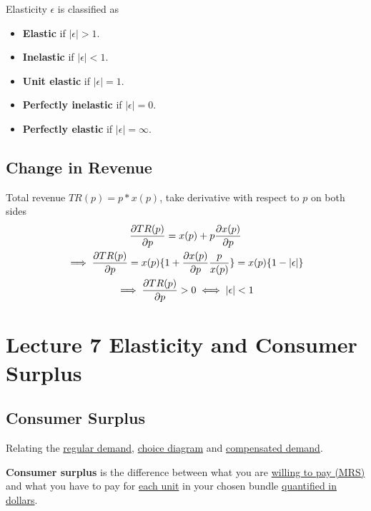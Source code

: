 \documentclass[]{article}
\begin{document}
            \begin{definition} Elasticity $\epsilon$ is classified as 
                \begin{itemize}
                    \item \textbf{Elastic} if $|\epsilon| > 1$.
                    \item \textbf{Inelastic} if $|\epsilon| < 1$.
                    \item \textbf{Unit elastic} if $|\epsilon| = 1$.
                    \item \textbf{Perfectly inelastic} if $|\epsilon| = 0$.
                    \item \textbf{Perfectly elastic} if $|\epsilon| = \infty$.
                \end{itemize}
            \end{definition}
            
        \subsection{Change in Revenue}
            \par Total revenue $TR(p) = p*x(p)$, take derivative with respect to $p$ on both sides
            \begin{gather*}
                \frac{\partial{TR(p)}}{\partial{p}} = x(p) + p\frac{\partial{x(p)}}{\partial{p}} \\
                \implies \frac{\partial{TR(p)}}{\partial{p}} = x(p) \{ 1 + \frac{\partial{x(p)}}{\partial{p}} \frac{p}{x(p)} \} = x(p) \{1 - |\epsilon| \}\\
                \implies \frac{\partial{TR(p)}}{\partial{p}} > 0 \iff |\epsilon| < 1 \\
            \end{gather*}
        
    \section{Lecture 7 Elasticity and Consumer Surplus}
        \subsection{Consumer Surplus}
            \par Relating the \ul{regular demand}, \ul{choice diagram} and \ul{compensated demand}.
        
            \begin{definition}
                \textbf{Consumer surplus} is the difference between what you are \ul{willing to pay (MRS)} and what you have to pay for \ul{each unit} in your chosen bundle \ul{quantified in dollars}.
            \end{definition}
            
\end{document}
